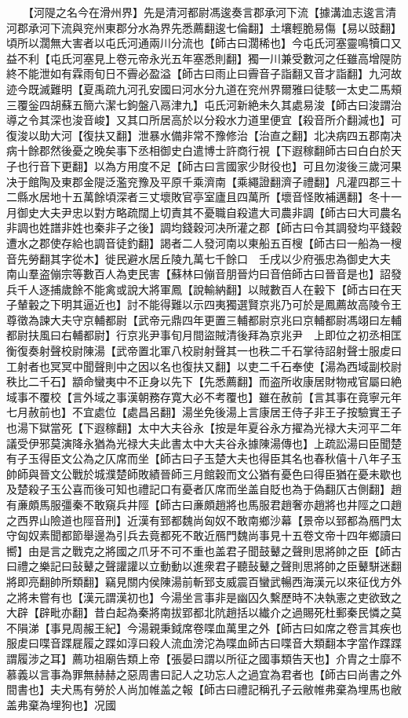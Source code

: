 　　【河隄之名今在滑州界】先是清河都尉馮逡奏言郡承河下流【據溝洫志逡言清河郡承河下流與兖州東郡分水為界先悉薦翻逡七倫翻】土壤輕脆易傷【易以豉翻】頃所以濶無大害者以屯氏河通兩川分流也【師古曰濶稀也】今屯氏河塞靈鳴犢口又益不利【屯氏河塞見上卷元帝永光五年塞悉則翻】獨一川兼受數河之任雖高增隄防終不能泄如有霖雨旬日不霽必盈溢【師古曰雨止曰霽音子詣翻又音才詣翻】九河故迹今既滅難明【夏禹疏九河孔安國曰河水分九道在兖州界爾雅曰徒駭一太史二馬頰三覆釡四胡蘇五簡六潔七鉤盤八鬲津九】屯氏河新絶未久其處易浚【師古曰浚謂治導之令其深也浚音峻】又其口所居高於以分殺水力道里便宜【殺音所介翻減也】可復浚以助大河【復扶又翻】泄暴水備非常不豫修治【治直之翻】北决病四五郡南决病十餘郡然後憂之晚矣事下丞相御史白遣博士許商行視【下遐稼翻師古曰白白於天子也行音下更翻】以為方用度不足【師古曰言國家少財役也】可且勿浚後三歲河果决于館陶及東郡金隄泛濫兖豫及平原千乘濟南【乘繩證翻濟子禮翻】凡灌四郡三十二縣水居地十五萬餘頃深者三丈壞敗官亭室廬且四萬所【壞音怪敗補邁翻】冬十一月御史大夫尹忠以對方略疏闊上切責其不憂職自殺遣大司農非調【師古曰大司農名非調也姓譜非姓也秦非子之後】調均錢穀河决所灌之郡【師古曰令其調發均平錢穀遭水之郡使存給也調音徒釣翻】謁者二人發河南以東船五百㮴【師古曰一船為一㮴音先勞翻其字從木】徙民避水居丘陵九萬七千餘口　壬戌以少府張忠為御史大夫　南山羣盗傰宗等數百人為吏民害【蘇林曰傰音朋晉灼曰音倍師古曰晉音是也】詔發兵千人逐捕歲餘不能禽或說大將軍鳳【說輸納翻】以賊數百人在轂下【師古曰在天子輦轂之下明其逼近也】討不能得難以示四夷獨選賢京兆乃可於是鳳薦故高陵令王尊徵為諫大夫守京輔都尉【武帝元鼎四年更置三輔都尉京兆曰京輔都尉馮翊曰左輔都尉扶風曰右輔都尉】行京兆尹事旬月間盜賊清後拜為京兆尹　上即位之初丞相匡衡復奏射聲校尉陳湯【武帝置北軍八校尉射聲其一也秩二千石掌待詔射聲士服䖍曰工射者也冥冥中聞聲則中之因以名也復扶又翻】以吏二千石奉使【湯為西域副校尉秩比二千石】顓命蠻夷中不正身以先下【先悉薦翻】而盗所收康居財物戒官屬曰絶域事不覆校【言外域之事漢朝務存寛大必不考覆也】雖在赦前【言其事在竟寧元年七月赦前也】不宜處位【處昌呂翻】湯坐免後湯上言康居王侍子非王子按驗實王子也湯下獄當死【下遐稼翻】太中大夫谷永【按是年夏谷永方擢為光禄大夫河平二年議受伊邪莫演降永猶為光禄大夫此書太中大夫谷永據陳湯傳也】上疏訟湯曰臣聞楚有子玉得臣文公為之仄席而坐【師古曰子玉楚大夫也得臣其名也春秋僖十八年子玉帥師與晉文公戰於城濮楚師敗績晉師三月館穀而文公猶有憂色曰得臣猶在憂未歇也及楚殺子玉公喜而後可知也禮記口有憂者仄席而坐盖自貶也為于偽翻仄古側翻】趙有亷頗馬服彊秦不敢窺兵井陘【師古曰亷頗趙將也馬服君趙奢亦趙將也井陘之口趙之西界山險道也陘音刑】近漢有郅都魏尚匈奴不敢南鄉沙幕【景帝以郅都為鴈門太守匈奴素聞都節舉邊為引兵去竟都死不敢近鴈門魏尚事見十五卷文帝十四年鄉讀曰嚮】由是言之戰克之將國之爪牙不可不重也盖君子聞鼓鼙之聲則思將帥之臣【師古曰禮之樂記曰鼔鼙之聲讙讙以立動動以進衆君子聽鼔鼙之聲則思將帥之臣鼙駢迷翻將即亮翻帥所類翻】竊見關内侯陳湯前斬郅支威震百蠻武暢西海漢元以來征伐方外之將未嘗有也【漢元謂漢初也】今湯坐言事非是幽囚久繫歷時不决執憲之吏欲致之大辟【辟毗亦翻】昔白起為秦將南拔郢都北阬趙括以纎介之過賜死杜郵秦民憐之莫不隕涕【事見周赧王紀】今湯親秉鉞席卷喋血萬里之外【師古曰如席之卷言其疾也服䖍曰喋音蹀屣履之蹀如淳曰殺人流血滂沱為喋血師古曰喋音大類翻本字當作蹀蹀謂履涉之耳】薦功祖廟告類上帝【張晏曰謂以所征之國事類告天也】介胄之士靡不慕義以言事為罪無赫赫之惡周書曰記人之功忘人之過宜為君者也【師古曰尚書之外間書也】夫犬馬有勞於人尚加帷盖之報【師古曰禮記稱孔子云敝帷弗棄為埋馬也敝盖弗棄為埋狗也】况國